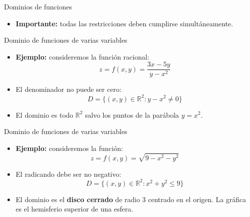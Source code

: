 \documentclass[main.tex]{subfiles}
\begin{document}
\begin{frame}{Dominios de funciones}
  \begin{itemize}
    \item \textbf{Importante:} todas las restricciones deben cumplirse
          simultáneamente.
  \end{itemize}
\end{frame}

\begin{frame}{Dominio de funciones de varias variables}
  \begin{itemize}
    \item \textbf{Ejemplo:} consideremos la función racional:
          \[
            z=f(x,y)=\frac{3x-5y}{y-x^2}
          \]

    \item El denominador no puede ser cero:
          \[
            D=\{(x,y)\in\mathbb{R}^2:y-x^2\neq 0\}
          \]
  \end{itemize}


  \begin{itemize}
    \item El dominio es todo $\mathbb{R}^2$ salvo los puntos de la
          parábola $y=x^2$.
  \end{itemize}
\end{frame}

\begin{frame}{Dominio de funciones de varias variables}
  \begin{itemize}
    \item \textbf{Ejemplo:} consideremos la función:
          \[
            z=f(x,y)=\sqrt{9-x^2-y^2}
          \]

    \item El radicando debe ser no negativo:
          \[
            D=\{(x,y)\in\mathbb{R}^2:x^2+y^2\leq 9\}
          \]
  \end{itemize}


  \begin{itemize}
    \item El dominio es el \textbf{disco cerrado} de radio $3$ centrado
          en el origen. La gráfica es el hemisferio superior de una esfera.
  \end{itemize}
\end{frame}
\end{document}
